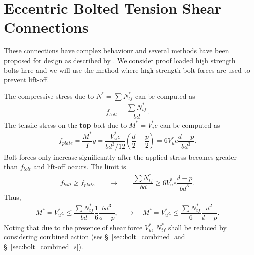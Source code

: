 \section{Eccentric Bolted Tension Shear Connections}
These connections have complex behaviour and several methods have been proposed for design as described by \citet{Smith1996}. We consider proof loaded high strength bolts here and we will use the method \citep{Salmon2009} where high strength bolt forces are used to prevent lift-off.
\begin{figure}[H]
\centering
\end{figure}
The compressive stress due to $N^*=\sum{}N^*_{tf}$ can be computed as
\begin{gather}
f_{bolt}=\dfrac{\sum{}N^*_{tf}}{bd}.
\end{gather}
The tensile stress on the \textbf{top} bolt due to $M^*=V_u^*e$ can be computed as
\begin{gather}
f_{plate}=\dfrac{M^*}{I}y=\dfrac{V_u^*e}{bd^3/12}\left(\dfrac{d}{2}-\dfrac{p}{2}\right)=6V_u^*e\dfrac{d-p}{bd^3}.
\end{gather}
Bolt forces only increase significantly after the applied stress becomes greater than $f_{bolt}$ and lift-off occurs. The limit is
\begin{gather*}
f_{bolt}\geqslant{}f_{plate}\qquad\longrightarrow\qquad
\dfrac{\sum{}N^*_{tf}}{bd}\geqslant{}6V_u^*e\dfrac{d-p}{bd^3}.
\end{gather*}
Thus,
\begin{gather}
M^*=V_u^*e\leqslant\dfrac{\sum{}N^*_{tf}}{bd}\dfrac{1}{6}\dfrac{bd^3}{d-p},\quad\longrightarrow\quad
M^*=V_u^*e\leqslant\dfrac{\sum{}N^*_{tf}}{6}\dfrac{d^2}{d-p}.
\end{gather}
Noting that due to the presence of shear force $V_u^*$, $N^*_{tf}$ shall be reduced by considering combined action (see \S~\ref{sec:bolt_combined} and \S~\ref{sec:bolt_combined_s}).
\clearpage
